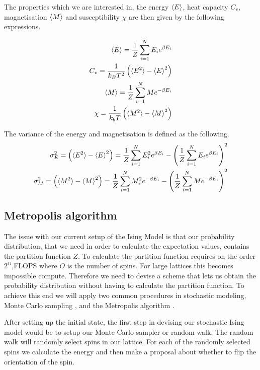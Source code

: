 The properties which we are interested in, the energy $\braket{E}$, heat
capacity $C_v$, magnetisation $\braket{M}$ and susceptibility $\chi$ are then given
by the following expressions.

\begin{eqnarray}
  \braket{E} = \frac{1}{Z} \sum_{i=1}^N E_i e^{\beta E_i} \\
  C_v = \frac{1}{k_B T^2}\left(\braket{E^2} - \braket{E}^2 \right) \\
  \braket{M} = \frac{1}{Z} \sum_{i=1}^{N} M e^{-\beta E_i} \\
  \chi = \frac{1}{k_b T}\left(\braket{M^2}- \braket{M}^2\right)
\end{eqnarray}

The variance of the energy and magnetisation is defined as the following.
\begin{eqnarray}
  \sigma_E^{2} = \left(\braket{E^2} - \braket{E}^2 \right) = \frac{1}{Z}
  \sum_{i=1}^N E_i^2 e^{\beta E_i} - \left(\frac{1}{Z} \sum_{i=1}^N E_i e^{\beta
  E_i}\right)^2  \\
  \sigma_M^{2} = \left(\braket{M^2}- \braket{M}^2\right) = \frac{1}{Z} \sum_{i=1}^{N} M_i^2 e^{-\beta E_i}  - \left(\frac{1}{Z} \sum_{i=1}^{N} M e^{-\beta E_i}  \right)^2
\end{eqnarray}


\subsection{Metropolis algorithm}

The issue with our current setup of the Ising Model is that our probability
distribution, that we need in order to calculate the expectation values,
contains the partition function $Z$. To calculate the partition function
requires on the order $2^{O}$,FLOPS where $O$ is the number of spins. For large
lattices this becomes impossible compute. Therefore we need to devise a scheme that lets us
obtain the probability distribution without having to calculate the partition
function. To achieve this end we will apply two common procedures in stochastic
modeling, Monte Carlo sampling \parencite{P3}, and the Metropolis algorithm .

After setting up the initial state, the first step in devising our
stochastic Ising model would be to setup our Monte Carlo sampler or random walk.
The random walk will randomly select spins in
our lattice. For each of the randomly selected spins we calculate the energy and
then make a proposal about whether to flip the orientation of the spin.

